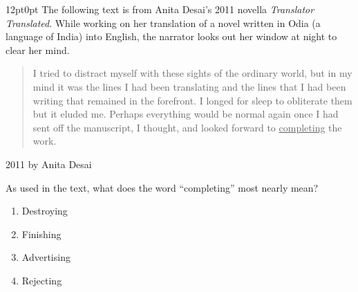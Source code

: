 \documentclass[11pt, twocolumn]{article}
\newcounter{questionnum}
\begin{document}
\vspace{6pt}\noindent
\begin{minipage}{\columnwidth}\raggedright
\noindent{}\par\vspace{8pt}
\begin{adjustwidth}{12pt}{0pt}
The following text is from Anita Desai's 2011 novella \textit{Translator Translated}. While working on her translation of a novel written in Odia (a language of India) into English, the narrator looks out her window at night to clear her mind.

\vspace{6pt}
\begin{quote}

I tried to distract myself with these sights of the ordinary world, but in my mind it was the lines I had been translating and the lines that I had been writing that remained in the forefront. I longed for sleep to obliterate them but it eluded me. Perhaps everything would be normal again once I had sent off the manuscript, I thought, and looked forward to \uline{completing} the work.

\end{quote}

\textcopyright{}2011 by Anita Desai
\vspace{6pt}

As used in the text, what does the word ``completing'' most nearly mean?
\begin{enumerate}[label=\Alph*),leftmargin=18pt,topsep=3pt,itemsep=2pt]
  \item Destroying
  \item Finishing
  \item Advertising
  \item Rejecting
\end{enumerate}
\end{adjustwidth}
\end{minipage}\par
\end{document}
